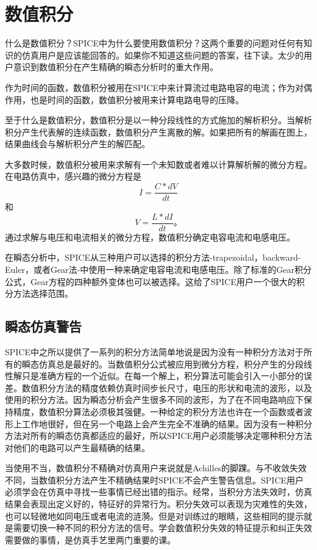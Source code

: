 \chapter{数值积分}
\label{chap:4}
什么是数值积分？SPICE中为什么要使用数值积分？这两个重要的问题对任何有知识的仿真用户是应该能回答的。如果你不知道这些问题的答案，往下读。太少的用户意识到数值积分在产生精确的瞬态分析时的重大作用。

作为时间的函数，数值积分被用在SPICE中来计算流过电路电容的电流；作为对偶作用，也是时间的函数，数值积分被用来计算电路电导的压降。

至于什么是数值积分，数值积分是以一种分段线性的方式施加的解析积分。当解析积分产生代表解的连续函数，数值积分产生离散的解。如果把所有的解画在图上，结果曲线会与解析积分产生的解匹配。

大多数时候，数值积分被用来求解有一个未知数或者难以计算解析解的微分方程。在电路仿真中，感兴趣的微分方程是
\begin{equation}
    I=\frac{C*dV}{dt}
    \label{eq:4.1}
\end{equation}
和
\begin{equation}
    V=\frac{L*dI}{dt}。
    \label{eq:4.2}
\end{equation}
通过求解与电压和电流相关的微分方程，数值积分确定电容电流和电感电压。

在瞬态分析中，SPICE从三种用户可以选择的积分方法-trapezoidal，backward-Euler，或者Gear法-中使用一种来确定电容电流和电感电压。除了标准的Gear积分公式，Gear方程的四种额外变体也可以被选择。这给了SPICE用户一个很大的积分方法选择范围。

\section{瞬态仿真警告}
SPICE中之所以提供了一系列的积分方法简单地说是因为没有一种积分方法对于所有的瞬态仿真总是最好的。当数值积分公式被应用到微分方程，积分产生的分段线性解只是准确方程的一个近似。在每一个解上，积分算法可能会引入一小部分的误差。数值积分方法的精度依赖仿真时间步长尺寸，电压的形状和电流的波形，以及使用的积分方法。因为瞬态分析会产生很多不同的波形，为了在不同电路响应下保持精度，数值积分算法必须极其强健。一种给定的积分方法也许在一个函数或者波形上工作地很好，但在另一个电路上会产生完全不准确的结果。因为没有一种积分方法对所有的瞬态仿真都适应的最好，所以SPICE用户必须能够决定哪种积分方法对他们的电路可以产生最精确的结果。

当使用不当，数值积分不精确对仿真用户来说就是Achilles的脚踝。与不收敛失效不同，当数值积分方法产生不精确结果时SPICE不会产生警告信息。SPICE用户必须学会在仿真中寻找一些事情已经出错的指示。经常，当积分方法失效时，仿真结果会表现出定义好的，特征好的异常行为。积分失效可以表现为灾难性的失效，也可以轻微地如同电压或者电流的涟漪。但是对训练过的眼睛，这些相同的提示就是需要切换一种不同的积分方法的信号。学会数值积分失效的特征提示和纠正失效需要做的事情，是仿真手艺里两门重要的课。

